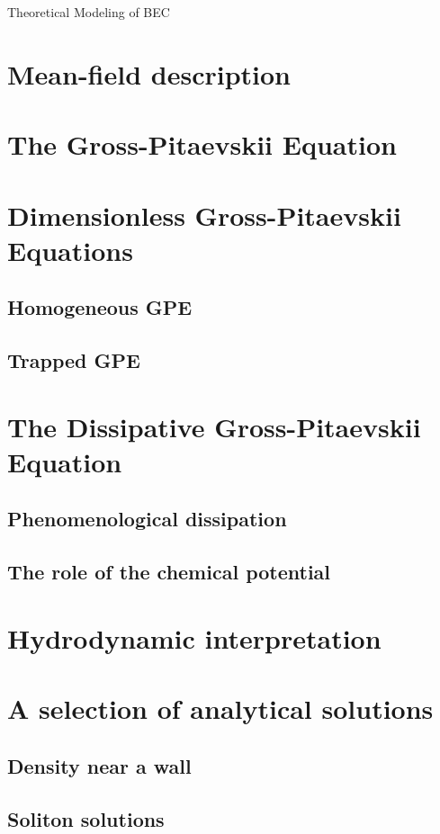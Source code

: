 \begin{chapter}{\label{cha:theoretical_model}Theoretical Modeling of BEC}
\section{\label{section:meanfield} Mean-field description}
\section{\label{section:gpe} The Gross-Pitaevskii Equation}
\section{\label{section:gpedimless} Dimensionless Gross-Pitaevskii Equations}
	\subsection{\label{section:gpedimlesshomg} Homogeneous GPE}
	\subsection{\label{section:gpedimlesstrap} Trapped GPE}
\section{\label{section:gpe} The Dissipative Gross-Pitaevskii Equation}
	\subsection{\label{section:gamma} Phenomenological dissipation}
	\subsection{\label{section:mu} The role of the chemical potential}
\section{\label{section:hydrodynamic} Hydrodynamic interpretation}
\section{\label{section:solutions} A selection of analytical solutions}
	\subsection{\label{section:wall} Density near a wall}
	\subsection{\label{section:soliton} Soliton solutions}

\end{chapter}
